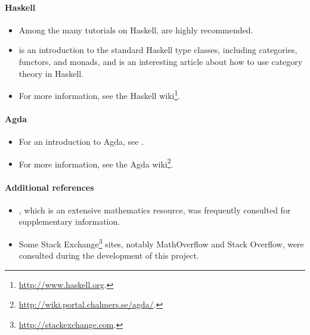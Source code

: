 \paragraph{Haskell}

\begin{itemize}
\item
  Among the many tutorials on Haskell,
  \parencites{lipovaca-2011}{osullivan-et-al-2008} are highly
  recommended.

\item
  \textcite{yorgey-2009} is an introduction to the standard Haskell
  type classes, including categories, functors, and monads, and
  \parencite{elkins-2009} is an interesting article about how to use
  category theory in Haskell.

\item
  For more information, see the Haskell
  wiki\footnote{\url{http://www.haskell.org}.}.

\end{itemize}

\paragraph{Agda}

\begin{itemize}
\item
  For an introduction to Agda, see
  \parencites{bove-dybjer-2009}{norell-2009}.

\item
  For more information, see the Agda
  wiki\footnote{\url{http://wiki.portal.chalmers.se/agda/}.}.

\end{itemize}

\paragraph{Additional references}

\begin{itemize}
\item
  \textcite{weisstein-mathworld}, which is an extensive mathematics
  resource, was frequently consulted for supplementary information.

\item
  Some Stack Exchange\footnote{\url{http://stackexchange.com}.} sites,
  notably MathOverflow and Stack Overflow, were consulted during the
  development of this project.

\end{itemize}

